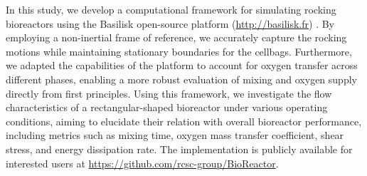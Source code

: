 \documentclass[final,3p,times,twocolumn,authoryear]{elsarticle}
\theoremstyle{definition}
\begin{document}
In this study, we develop a computational framework for simulating rocking bioreactors using the Basilisk open-source platform (\href{http://basilisk.fr}{http://basilisk.fr}) \citep{Popinet2003,Popinet2009,Popinet2015}. By employing a non-inertial frame of reference, we accurately capture the rocking motions while maintaining stationary boundaries for the cellbags. Furthermore, we adapted the capabilities of the platform to account for oxygen transfer across different phases, enabling a more robust evaluation of mixing and oxygen supply directly from first principles. Using this framework, we investigate the flow characteristics of a rectangular-shaped bioreactor under various operating conditions, aiming to elucidate their relation with overall bioreactor performance, including metrics such as mixing time, oxygen mass transfer coefficient, shear stress, and energy dissipation rate. The implementation is publicly available for interested users at \href{https://github.com/rcsc-group/BioReactor}{https://github.com/rcsc-group/BioReactor}.
   
\end{document}
